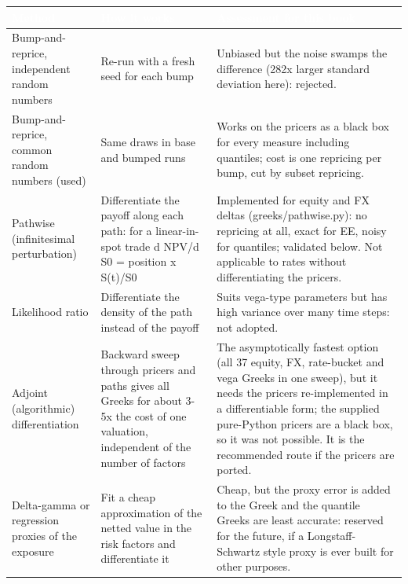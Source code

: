 \documentclass[11pt,letterpaper]{article}
\begin{document}
{\scriptsize\setlength{\LTpre}{4pt}\setlength{\LTpost}{6pt}
\begin{longtable}{>{\raggedright\arraybackslash}p{}>{\raggedright\arraybackslash}p{}>{\raggedright\arraybackslash}p{}}
\toprule
\rowcolor{navy}\textbf{\textcolor{white}{Method}} & \textbf{\textcolor{white}{How it works}} & \textbf{\textcolor{white}{Assessment for this book}} \\
\endhead
Bump-and-reprice, independent random numbers & Re-run with a fresh seed for each bump & Unbiased but the noise swamps the difference (282x larger standard deviation here): rejected. \\
\rowcolor{gray!9}Bump-and-reprice, common random numbers (used) & Same draws in base and bumped runs & Works on the pricers as a black box for every measure including quantiles; cost is one repricing per bump, cut by subset repricing. \\
Pathwise (infinitesimal perturbation) & Differentiate the payoff along each path: for a linear-in-spot trade d NPV/d S0 = position x S(t)/S0 & Implemented for equity and FX deltas (greeks/pathwise.py): no repricing at all, exact for EE, noisy for quantiles; validated below. Not applicable to rates without differentiating the pricers. \\
\rowcolor{gray!9}Likelihood ratio & Differentiate the density of the path instead of the payoff & Suits vega-type parameters but has high variance over many time steps: not adopted. \\
Adjoint (algorithmic) differentiation & Backward sweep through pricers and paths gives all Greeks for about 3-5x the cost of one valuation, independent of the number of factors & The asymptotically fastest option (all 37 equity, FX, rate-bucket and vega Greeks in one sweep), but it needs the pricers re-implemented in a differentiable form; the supplied pure-Python pricers are a black box, so it was not possible. It is the recommended route if the pricers are ported. \\
\rowcolor{gray!9}Delta-gamma or regression proxies of the exposure & Fit a cheap approximation of the netted value in the risk factors and differentiate it & Cheap, but the proxy error is added to the Greek and the quantile Greeks are least accurate: reserved for the future, if a Longstaff-Schwartz style proxy is ever built for other purposes. \\
\bottomrule
\end{longtable}}
\end{document}
